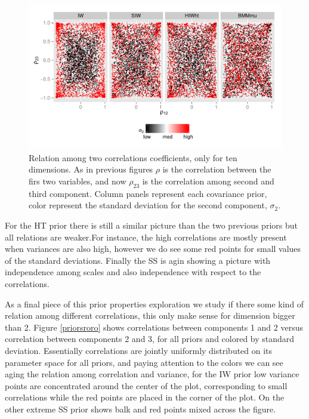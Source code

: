 \documentclass{article}
\begin{document}
\begin{figure}[htbp]
\begin{center}
 \includegraphics[width=\textwidth ]{priorsroro} 
  \vspace{-.5in}
\caption{Relation among two correlations coefficients, only for ten dimensions. As in previous figures $\rho$ is the correlation between the firs two variables, and now $\rho_{23}$ is the correlation among second and third component. Column panels represent each covariance prior, color represent the standard deviation for the second component, $\sigma_2$. \label{toro}}
\end{center}
\end{figure}

For the HT prior there is still a similar picture than the two previous priors but all relations are weaker.For instance, the high correlations are mostly present when variances are also high, however we do see some red points for small values of the standard deviations. 
Finally the SS is agin showing a picture with independence among scales and also independence with respect to the correlations. 

As a final piece of this prior properties exploration we study if there some kind of relation among different correlations, this only make sense for dimension bigger than 2. Figure \ref{priorsroro} shows correlations between components 1 and 2 versus correlation between components 2 and 3, for all priors and colored by standard deviation.  Essentially correlations are jointly uniformly distributed on its parameter space for all priors, and paying attention to the colors we can see aging the relation among correlation and variance, for the IW prior low variance points are concentrated around the center of the plot, corresponding to small correlations while the red points are placed in the corner of the plot. On the other extreme SS prior shows balk and red points mixed across the figure. 
\end{document}
